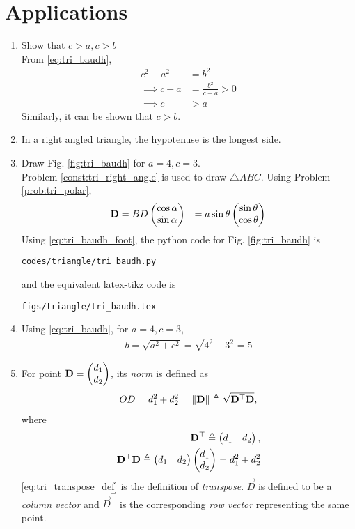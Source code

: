 \section{Applications}
\begin{enumerate}[label=\thesection.\arabic*.,ref=\thesection.\theenumi]
\item Show that $c > a, c > b$
%
	\\
\solution From 	\eqref{eq:tri_baudh},
	\begin{align}
	c^2 - a^2 &= b^2
\\
\implies c-a &= \frac{b^2}{c+a} > 0 
\\
\implies c &> a
	\end{align}
%
Similarly, it can be shown that $c > b$.
\item In a right angled triangle, the hypotenuse is the longest side.
\label{them:hyp_largest}
\iffalse
\item Draw Fig. \ref{fig:tri_baudh} for $a = 4, c =3$.
\label{const:tri_baudh}
%
\\
\solution Problem \ref{const:tri_right_angle} is used to draw $\triangle ABC$.
%
Using Problem \ref{prob:tri_polar},
\begin{align}
\vec{D} &= BD\myvec{\cos \alpha\\  \sin \alpha} 
&= a \sin \theta \myvec{ \sin \theta \\ \cos \theta } 
\label{eq:tri_baudh_foot}
\end{align}
%
Using \eqref{eq:tri_baudh_foot}, the python code for  Fig. \ref{fig:tri_baudh} is
\begin{lstlisting}
codes/triangle/tri_baudh.py
\end{lstlisting}
%
and the equivalent latex-tikz code is
%
\begin{lstlisting}
figs/triangle/tri_baudh.tex
\end{lstlisting}
%
\item Using 	\eqref{eq:tri_baudh}, for $a = 4, c = 3$,
%
\begin{align}
b = \sqrt{a^2+c^2} = \sqrt{4^2+3^2} = 5
\end{align}
%
\item For  point $\mathbf{D} = \begin{pmatrix}d_1\\d_2\end{pmatrix}$, its {\em norm} is defined as
%
\begin{align}
OD = d_1^2+d_2^2 = \norm{\vec{D}} \define \sqrt{\vec{D}^{\top}\vec{D}}, 
\label{eq:tri_norm_def}
\end{align}
%
where 
%
\begin{align}
\label{eq:tri_transpose_def}
 \vec{D}^{\top}  \define \myvec{d_1 & d_2},
\\
\vec{D}^{\top}\vec{D} \define \myvec{d_1 & d_2} \myvec{d_1 \\ d_2} = d_1^2+d_2^2
\end{align}
%
\eqref{eq:tri_transpose_def} is the definition of {\em transpose}. $\vec{D}$ is defined to be a {\em column vector} and $\vec{D}^{\top}$  is the corresponding {\em row vector} representing the same point.


\end{enumerate}
